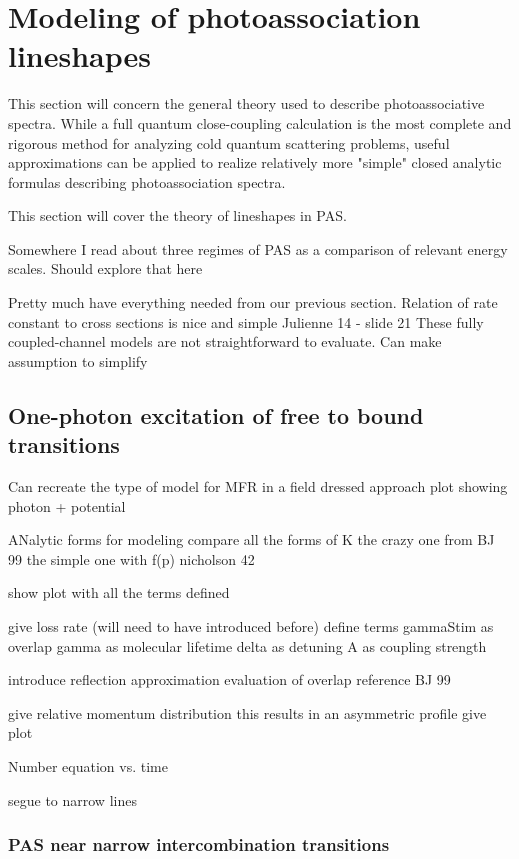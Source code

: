 \section{Modeling of photoassociation lineshapes} \label{sec:bohn_and_julienne}

This section will concern the general theory used to describe photoassociative spectra. While a full quantum close-coupling calculation is the most complete and rigorous method for analyzing cold quantum scattering problems, useful approximations can be applied to realize relatively more "simple" closed analytic formulas describing photoassociation spectra. 

This section will cover the theory of lineshapes in PAS.

Somewhere I read about three regimes of PAS as a comparison of relevant energy scales. Should explore that here

Pretty much have everything needed from our previous section.
Relation of rate constant to cross sections is nice and simple
		Julienne 14 - slide 21
These fully coupled-channel models are not straightforward to evaluate.
	Can make assumption to simplify




\subsection{One-photon excitation of free to bound transitions} \label{ssec:one_color_pa}

Can recreate the type of model for MFR in a field dressed approach
	plot showing photon + potential
	

	
ANalytic forms for modeling
	compare all the forms of K
		the crazy one from BJ 99
		the simple one with f(p)
		nicholson 42
	

show plot with all the terms defined

give loss rate (will need to have introduced before)
	define terms
		gammaStim as overlap
		gamma as molecular lifetime
		delta as detuning
		A as coupling strength
	
introduce reflection approximation
	evaluation of overlap
	reference BJ 99
	
give relative momentum distribution
	this results in an asymmetric profile
	give plot
	
Number equation vs. time

segue to narrow lines


\subsubsection{PAS near narrow intercombination transitions} \label{sssec:narrow_pa}


